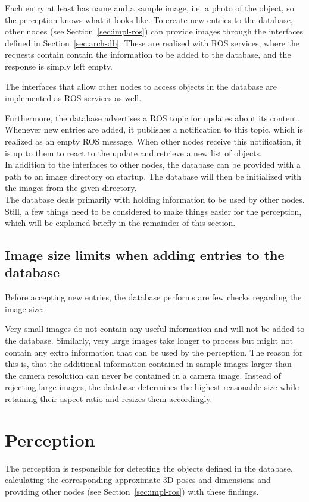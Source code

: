 Each entry at least has name and a sample image, i.e. a photo of the object, so the perception knows what it looks like. To create new entries to the database, other nodes (see Section~\ref{sec:impl-ros}) can provide images through the interfaces defined in Section~\ref{sec:arch-db}. These are realised with ROS services, where the requests contain contain the information to be added to the database, and the response is simply left empty.

The interfaces that allow other nodes to access objects in the database are implemented as ROS services as well.

Furthermore, the database advertises a ROS topic for updates about its content. Whenever new entries are added, it publishes a notification to this topic, which is realized as an empty ROS message. When other nodes receive this notification, it is up to them to react to the update and retrieve a new list of objects. \\

In addition to the interfaces to other nodes, the database can be provided with a path to an image directory on startup. The database will then be initialized with the images from the given directory. \\

The database deals primarily with holding information to be used by other nodes. Still, a few things need to be considered to make things easier for the perception, which will be explained briefly in the remainder of this section.

\subsection{Image size limits when adding entries to the database}
\label{sec:impl-db-limits}
Before accepting new entries, the database performs are few checks regarding the image size:

Very small images do not contain any useful information and will not be added to the database. Similarly, very large images take longer to process but might not contain any extra information that can be used by the perception. The reason for this is, that the additional information contained in sample images larger than the camera resolution can never be contained in a camera image. Instead of rejecting large images, the database determines the highest reasonable size while retaining their aspect ratio and resizes them accordingly.


\section{Perception}
\label{sec:impl-perception}
The perception is responsible for detecting the objects defined in the database, calculating the corresponding approximate 3D poses and dimensions and providing other nodes (see Section~\ref{sec:impl-ros}) with these findings. \\

